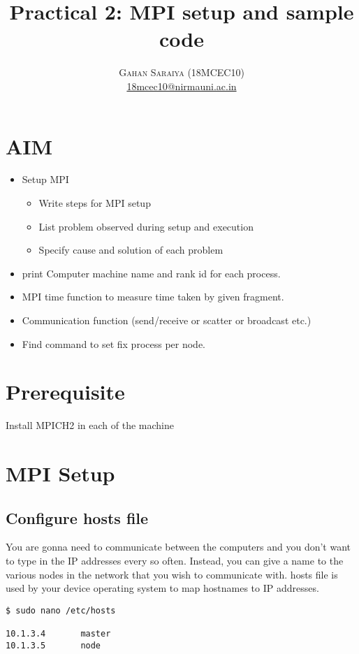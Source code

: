 \documentclass[paper=letter, fontsize=12pt]{article}
\title{\vspace{-15mm}\fontsize{24pt}{10pt}\selectfont\textbf{Practical 2: MPI setup and sample code}} %
\author{
\large
{\textsc{Gahan Saraiya (18MCEC10)}}\\[2mm]
\normalsize \href{mailto:18mcec10@nirmauni.ac.in}{18mcec10@nirmauni.ac.in}\\[2mm] %
}
\date{}
\begin{document}
\maketitle %
\thispagestyle{fancy} %

\section{AIM}
\begin{itemize}
	\item Setup MPI
	\begin{itemize}
		\item Write steps for MPI setup
		\item List problem observed during setup and execution
		\item Specify cause and solution of each problem
	\end{itemize}
    \item print Computer machine name and rank id for each process.
    \item MPI time function to measure time taken by given fragment.
    \item Communication function (send/receive or scatter or broadcast etc.)
    \item Find command to set fix process per node.
\end{itemize}

\section{Prerequisite}
Install MPICH2 in each of the machine

\section{MPI Setup}
\subsection{Configure hosts file}
You are gonna need to communicate between the computers and you don’t want to type in the IP addresses every so often. Instead, you can give a name to the various nodes in the network that you wish to communicate with. hosts file is used by your device operating system to map hostnames to IP addresses.

\begin{verbatim}
$ sudo nano /etc/hosts

10.1.3.4       master
10.1.3.5       node
\end{verbatim}
\end{document}
